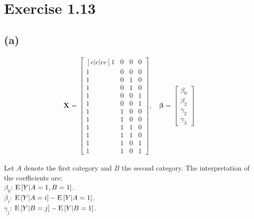 \section*{Exercise 1.13}
\subsection*{(a)}
\begin{align*}
\bm{X} = 
\begin{bmatrix}[c|c|cc]
1 & 0 & 0 & 0\\
1 & 0 & 0 & 0\\
1 & 0 & 1 & 0\\
1 & 0 & 1 & 0\\
1 & 0 & 0 & 1\\
1 & 0 & 0 & 1\\
\hline
1 & 1 & 0 & 0\\
1 & 1 & 0 & 0\\
1 & 1 & 1 & 0\\
1 & 1 & 1 & 0\\
1 & 1 & 0 & 1\\
1 & 1 & 0 & 1
\end{bmatrix}
, \quad
\bm{\beta} =
\begin{bmatrix}
\beta_{0}\\
\beta_{2}\\
\gamma_{2}\\
\gamma_{3}
\end{bmatrix}
\end{align*}


Let $A$ denote the first category and $B$ the second category. The interpretation of the coefficients are: \\
$\beta_{0}$: $\mathrm{E}\left[Y|A = 1, B = 1\right]$.\\
$\beta_{i}$: $\mathrm{E}\left[Y|A = i\right] - \mathrm{E}\left[Y|A = 1\right]$.\\
$\gamma_{j}$: $\mathrm{E}\left[Y|B = j\right] - \mathrm{E}\left[Y|B = 1\right]$.\\


